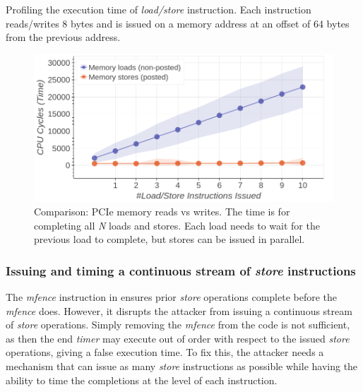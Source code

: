 \begin{minipage}{\textwidth}
    
    \captionsetup{type=lstlisting}
    \caption{Profiling the execution time of \textit{load/store} instruction.
    Each instruction reads/writes 8 bytes and is issued on a memory address at an offset of 64 bytes from the previous address.}
    \label{lst:pcie-mem-reads-v-writes}
\end{minipage}

\begin{figure}[!htb]
    \centering
    \includegraphics[width=0.8\columnwidth]{figures/interconnect-sc/store-ops/pcie_mem_reads_v_writes.png}
    \caption{Comparison: PCIe memory reads vs writes.
    The time is for completing all \textit{N} loads and stores.
    Each load needs to wait for the previous load to complete, but stores can be issued in parallel.}
    \label{fig:pcie-mem-reads-v-writes}
\end{figure}

\subsubsection{Issuing and timing a continuous stream of \textit{store} instructions}
\label{subsubsec:interconnect-sc-store-ops-challenges-measuring-time}

The \textit{mfence} instruction in  ensures prior \textit{store} operations complete before the \textit{mfence} does.
However, it disrupts the attacker from issuing a continuous stream of \textit{store} operations.
Simply removing the \textit{mfence} from the code is not sufficient, as then the end \textit{timer} may execute out of order with respect to the issued \textit{store} operations, giving a false execution time.
To fix this, the attacker needs a mechanism that can issue as many \textit{store} instructions as possible while having the ability to time the completions at the level of each instruction.

